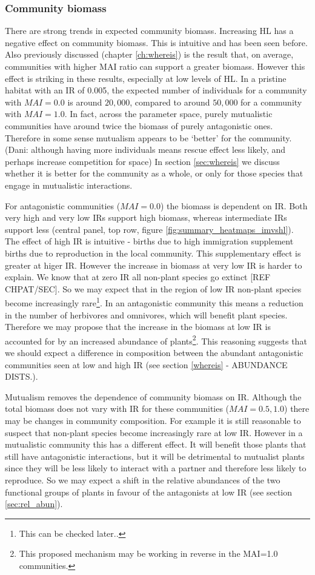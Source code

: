 \begin{itemize}
\subsubsection*{Community biomass}
There are strong trends in expected community biomass. Increasing HL has a negative effect on community biomass. This is intuitive and has been seen before. Also previously discussed (chapter \ref{ch:whereis}) is the result that, on average, communities with higher MAI ratio can support a greater biomass. However this effect is striking in these results, especially at low levels of HL. In a pristine habitat with an IR of 0.005, the expected number of individuals for a community with $MAI=0.0$ is around $20,000$, compared to around $50,000$ for a community with $MAI=1.0$. In fact, across the parameter space, purely mutualistic communities have around twice the biomass of purely antagonistic ones. Therefore in some sense mutualism appears to be `better' for the community. (Dani: although having more individuals means rescue effect less likely, and perhaps increase competition for space)  In section \ref{sec:whereis} we discuss whether it is better for the community as a whole, or only for those species that engage in mutualistic interactions.

For antagonistic communities ($MAI=0.0$) the biomass is dependent on IR. Both very high and very low IRs support high biomass, whereas intermediate IRs support less (central panel, top row, figure \ref{fig:summary_heatmaps_imvshl}). The effect of high IR is intuitive - births due to high immigration supplement births due to reproduction in the local community. This supplementary effect is greater at higer IR. However the increase in biomass at very low IR is harder to explain. We know that at zero IR all non-plant species go extinct [REF CHPAT/SEC]. So we may expect that in the region of low IR non-plant species become increasingly rare\footnote{This can be checked later..}. In an antagonistic community this means a reduction in the number of herbivores and omnivores, which will benefit plant species. Therefore we may propose that the increase in the biomass at low IR is accounted for by an increased abundance of plants\footnote{This proposed mechanism may be working in reverse in the MAI=1.0 communities.}. This reasoning suggests that we should expect a difference in composition between the abundant antagonistic communities seen at low and high IR (see section \ref{whereis} - ABUNDANCE DISTS.).    

Mutualism removes the dependence of community biomass on IR. Although the total biomass does not vary with IR for these communities ($MAI=0.5,1.0$) there may be changes in community composition. For example it is still reasonable to suspect that non-plant species become increasingly rare at low IR. However in a mutualistic community this has a different effect. It will benefit those plants that still have antagonistic interactions, but it will be detrimental to mutualist plants since they will be less likely to interact with a partner and therefore less likely to reproduce. So we may expect a shift in the relative abundances of the two functional groups of plants in favour of the antagonists at low IR (see section \ref{sec:rel_abun}).


\end{itemize}

